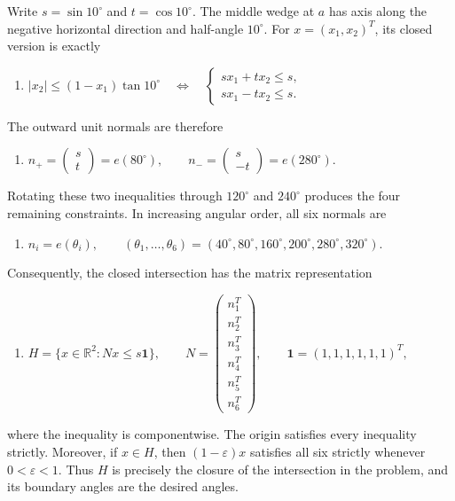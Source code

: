 \begin{enumerate}
 Write $s=\sin10^\circ$ and $t=\cos10^\circ$. The middle wedge at $a$ has axis along the negative horizontal direction and half-angle $10^\circ$. For $x=(x_1,x_2)^T$, its closed version is exactly

 
            \begin{enumerate}[label=(\roman*)]
                \item $|x_2|\le (1-x_1)\tan10^\circ \quad\Longleftrightarrow\quad \begin{cases} sx_1+tx_2\le s,\\ sx_1-tx_2\le s. \end{cases}$
            \end{enumerate}
            The outward unit normals are therefore

 
            \begin{enumerate}[label=(\roman*)]
                \item $n_+=\begin{pmatrix}s\\t\end{pmatrix}=e(80^\circ), \qquad n_-=\begin{pmatrix}s\\-t\end{pmatrix}=e(280^\circ).$
            \end{enumerate}
            Rotating these two inequalities through $120^\circ$ and $240^\circ$ produces the four remaining constraints. In increasing angular order, all six normals are

 
            \begin{enumerate}[label=(\roman*)]
                \item $n_i=e(\theta_i),\qquad (\theta_1,\ldots,\theta_6) =(40^\circ,80^\circ,160^\circ,200^\circ,280^\circ,320^\circ).$
            \end{enumerate}
            Consequently, the closed intersection has the matrix representation

 
            \begin{enumerate}[label=(\roman*)]
                \item $H=\{x\in\mathbb R^2:Nx\le s\mathbf1\}, \qquad N=\begin{pmatrix}n_1^T\\n_2^T\\n_3^T\\n_4^T\\n_5^T\\n_6^T\end{pmatrix}, \qquad \mathbf1=(1,1,1,1,1,1)^T,$
            \end{enumerate}
            where the inequality is componentwise. The origin satisfies every inequality strictly. Moreover, if $x\in H$, then $(1-\varepsilon)x$ satisfies all six strictly whenever $0<\varepsilon<1$. Thus $H$ is precisely the closure of the intersection in the problem, and its boundary angles are the desired angles.


\end{enumerate}
